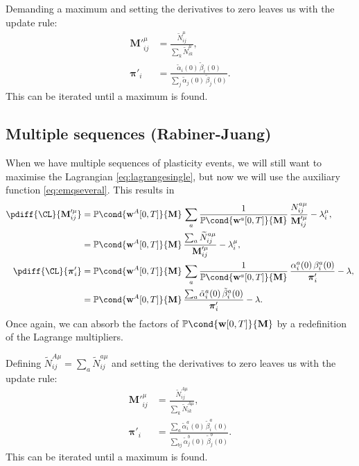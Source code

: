 \documentclass[12pt]{article}
\newcommand{\pib}{\boldsymbol{\pi}}
\newcommand{\w}{\mathbf{w}}
\newcommand{\M}{\mathbf{M}}
\newcommand{\pr}{\mathbb{P}}
\begin{document}
Demanding a maximum and setting the derivatives to zero leaves us with the update rule:
%
\begin{equation}\label{eq:BWupdate}
\begin{aligned}
  \M'^\mu_{ij} &= \frac{ \widetilde{N}^\mu_{ij} }{ \sum_k \widetilde{N}^\mu_{ik} },\\
  \pib'_{i} &= \frac{ \tilde{\alpha}_i(0) \, \tilde{\beta}_i(0) }{ \sum_j \tilde{\alpha}_j(0) \, \tilde{\beta}_j(0) }.
\end{aligned}
\end{equation}
%
This can be iterated until a maximum is found.


\subsection{Multiple sequences (Rabiner-Juang) \label{sec:rj}}

When we have multiple sequences of plasticity events, we will still want to maximise the Lagrangian \eqref{eq:lagrangesingle}, but now we will use the auxiliary function \eqref{eq:emqseveral}.
This results in
%
\begin{equation}\label{eq:multidiffs}
\begin{aligned}
  \pdiff{\CL}{\M'^\mu_{ij}} &= \pr\cond{\w^A[0,T]}{\M} \,\sum_a \frac{1}{\pr\cond{\w^a[0,T]}{\M}} \,
    \frac{ N^{a\mu}_{ij} }{ \M'^\mu_{ij} } - \lambda^\mu_{i}, \\
    &= \pr\cond{\w^A[0,T]}{\M} \, \frac{ \sum_a \widetilde{N}^{a\mu}_{ij} }{ \M'^\mu_{ij} } - \lambda^\mu_{i}, \\
  \pdiff{\CL}{\pib'_{i}} &= \pr\cond{\w^A[0,T]}{\M} \,\sum_a \frac{1}{\pr\cond{\w^a[0,T]}{\M}} \,
    \frac{ \alpha^a_i(0) \, \beta^a_i(0) }{ \pib'_{i} } - \lambda,\\
    &= \pr\cond{\w^A[0,T]}{\M} \,
    \frac{ \sum_a \tilde{\alpha}^a_i(0) \, \tilde{\beta}^a_i(0) }{ \pib'_{i} } - \lambda.
\end{aligned}
\end{equation}
%
Once again, we can absorb the factors of $\pr\cond{\w[0,T]}{\M}$ by a redefinition of the Lagrange multipliers.

Defining $\widetilde{N}^{A\mu}_{ij} = \sum_a \widetilde{N}^{a\mu}_{ij}$ and setting the derivatives to zero leaves us with the update rule:
%
\begin{equation}\label{eq:RJupdate}
\begin{aligned}
  \M'^\mu_{ij} &= \frac{ \widetilde{N}^{A\mu}_{ij} }{ \sum_k \widetilde{N}^{A\mu}_{ik} },\\
  \pib'_{i} &= \frac{ \sum_a \tilde{\alpha}^a_i(0) \, \tilde{\beta}^a_i(0) }{ \sum_{bj} \tilde{\alpha}^b_j(0) \, \tilde{\beta}^b_j(0) }.
\end{aligned}
\end{equation}
%
This can be iterated until a maximum is found.
\end{document}
